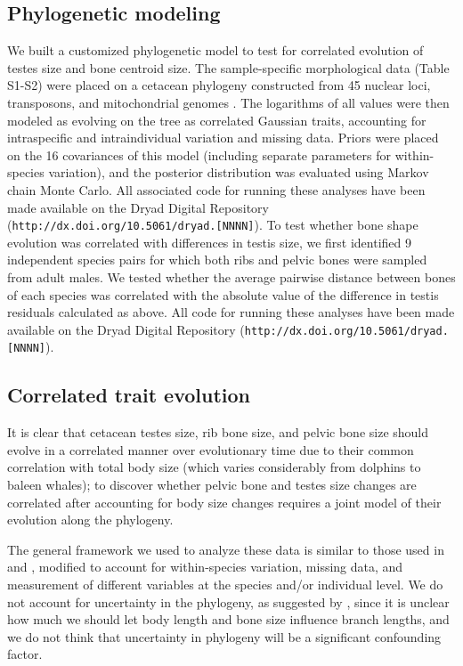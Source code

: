 \documentclass[12pt]{article}
\newcommand{\url}[1]{\texttt{#1}}
\begin{document}
\subsection*{Phylogenetic modeling}
We built a customized phylogenetic model to test for correlated evolution of testes size and bone centroid size.  The sample-specific morphological data (Table S1-S2) were placed on a cetacean phylogeny constructed from 45 nuclear loci, transposons, and mitochondrial genomes \citep{mcgowen2009}.  The logarithms of all values were then modeled as evolving on the tree as correlated Gaussian traits, accounting for intraspecific and intraindividual variation and missing data.  Priors were placed on the 16 covariances of this model (including separate parameters for within-species variation), and the posterior distribution was evaluated using Markov chain Monte Carlo.  All associated code for running these analyses have been made available on the Dryad Digital Repository (\url{http://dx.doi.org/10.5061/dryad.[NNNN]}).
To test whether bone shape evolution was correlated with differences in testis size, we first identified 9 independent species pairs for which both ribs and pelvic bones were sampled from adult males.  We tested whether the average pairwise distance between bones of each species was correlated with the absolute value of the difference in testis residuals calculated as above.  All code for running these analyses have been made available on the Dryad Digital Repository (\url{http://dx.doi.org/10.5061/dryad.[NNNN]}).
 



\subsection*{Correlated trait evolution}

It is clear that cetacean testes size, rib bone size, and pelvic bone size
should evolve in a correlated manner over evolutionary time
due to their common correlation with total body size 
(which varies considerably from dolphins to baleen whales);
to discover whether pelvic bone and testes size changes are correlated
after accounting for body size changes
requires a joint model of their evolution along the phylogeny.

The general framework we used to analyze these data is similar to those used in \citet{revell2009phylogenetic} and \citet{harmon2008geiger},
modified to account for within-species variation,
missing data,
and measurement of different variables at the species and/or individual level.
We do not account for uncertainty in the phylogeny,
as suggested by \citet{huelsenbeck2003detecting},
since it is unclear how much we should let body length and bone size influence branch lengths,
and we do not think that uncertainty in phylogeny will be a significant confounding factor.
\end{document}
